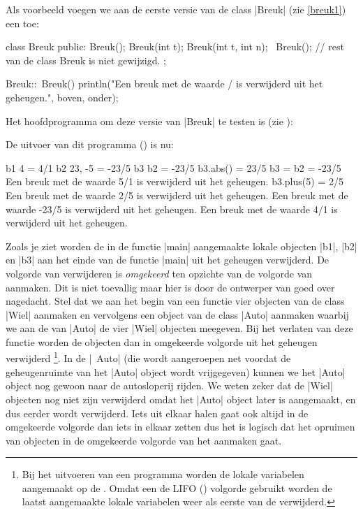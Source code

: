 \begin{cpplstShortInline}
Als voorbeeld voegen we aan de eerste versie van de class |Breuk| (zie \cref{breuk1}) een  toe:
\begin{cpplstfragment}
class Breuk {
public:
    Breuk();
    Breuk(int t);
    Breuk(int t, int n);
    ~Breuk();
    // rest van de class Breuk is niet gewijzigd.
};

Breuk::~Breuk() {
    println("Een breuk met de waarde {}/{} is verwijderd uit het geheugen.", boven, onder);
}
\end{cpplstfragment}

Het hoofdprogramma om deze versie van |Breuk| te testen is (zie ):

De uitvoer van dit programma () is nu:
\begin{coutput}
b1 {4} = 4/1
b2 {23, -5} = -23/5
b3 {b2} = -23/5
b3.abs() = 23/5
b3 = b2 = -23/5
Een breuk met de waarde 5/1 is verwijderd uit het geheugen.
b3.plus(5) = 2/5
Een breuk met de waarde 2/5 is verwijderd uit het geheugen.
Een breuk met de waarde -23/5 is verwijderd uit het geheugen.
Een breuk met de waarde 4/1 is verwijderd uit het geheugen.
\end{coutput}

Zoals je ziet worden de in de functie |main| aangemaakte lokale objecten |b1|, |b2| en |b3| aan het einde van de functie |main| uit het geheugen verwijderd.
De volgorde van verwijderen is \emph{omgekeerd} ten opzichte van de volgorde van aanmaken.
Dit is niet toevallig maar hier is door de ontwerper van \Cpp{} goed over nagedacht.
Stel dat we aan het begin van een functie vier objecten van de class |Wiel| aanmaken en vervolgens een object van de class |Auto| aanmaken waarbij we aan de  van |Auto| de vier |Wiel| objecten meegeven.
Bij het verlaten van deze functie worden de objecten dan in omgekeerde volgorde uit het geheugen verwijderd%
\footnote{%
    Bij het uitvoeren van een programma worden de lokale variabelen aangemaakt op de .
    Omdat een  de LIFO () volgorde gebruikt worden de laatst aangemaakte lokale variabelen weer als eerste van de  verwijderd.
}.
In de  |~Auto| (die wordt aangeroepen net voordat de geheugenruimte van het |Auto| object wordt vrijgegeven) kunnen we het |Auto| object nog gewoon naar de autosloperij rijden.
We weten zeker dat de |Wiel| objecten nog niet zijn verwijderd omdat het |Auto| object later is aangemaakt, en dus eerder wordt verwijderd.
Iets uit elkaar halen gaat ook altijd in de omgekeerde volgorde dan iets in elkaar zetten dus het is logisch dat het opruimen van objecten in de omgekeerde volgorde van het aanmaken gaat.


\end{cpplstShortInline}

